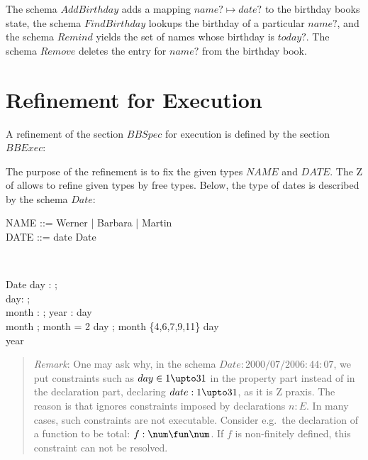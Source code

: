 \documentclass{article}
\newenvironment{remark}
{\begin{small}\begin{quote}\emph{Remark}: }{\end{quote}\end{small}}
\begin{document}
The schema $AddBirthday$ adds a mapping $name? \mapsto date?$ to
the birthday books state, the schema $FindBirthday$ lookups the
birthday of a particular $name?$, and the schema $Remind$ yields
the set of names whose birthday is $today?$. The schema $Remove$
deletes the entry for $name?$ from the birthday book. 

\section{Refinement for Execution}

A refinement of the section $BBSpec$ for execution is defined by the
section $BBExec$:

\begin{zdirectives}
\end{zdirectives}


The purpose of the refinement is to fix the given types $NAME$ and
$DATE$. The Z of \Zeta{} allows to refine given
types by free types. Below, the type of dates is described by the
schema ${}Date$:

\begin{zedgroup}
\begin{zed}
  NAME ::= Werner | Barbara | Martin\\
  DATE ::= date \ldata Date \rdata \\
\end{zed} \\

\begin{schema}{Date}
  day : \nat; \\
  day: \nat; \\
  month : \nat;
  year : \nat
\where
  day   \\
  month  ;
  month = 2 \implies day ;
  month \in \{4,6,7,9,11\} \implies day  \\
  year 
\end{schema}
\end{zedgroup}

\begin{remark}
  One may ask why, in the schema $Date: 2000/07/20 06:44:07 $, we put constraints such as
  $day \in 1 \upto 31$ in the property part instead of in the
  declaration part, declaring $date: 1 \upto 31$, as it is Z praxis.
  The reason is that \ZAP{} ignores constraints imposed by
  declarations $n:E$. In many cases, such constraints are not
  executable. Consider e.g.~the declaration of a function to be total:
  $f: \num \fun \num$. If $f$ is non-finitely defined, this constraint
  can not be resolved.
\end{remark}
\end{document}
